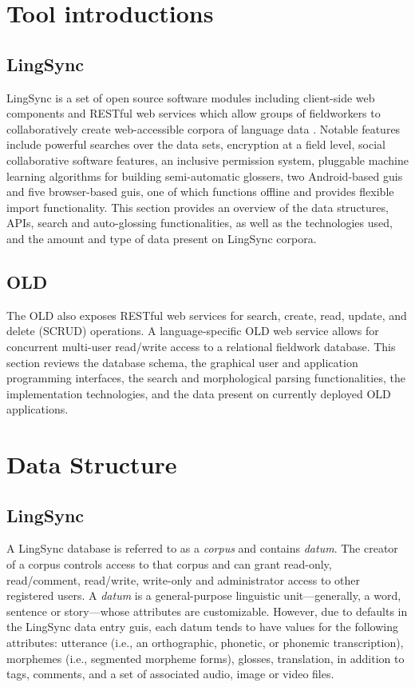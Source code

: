 \documentclass[11pt]{article}
\begin{document}
\section{Tool introductions}


\subsection{LingSync}\label{sec:lingsync}

LingSync is a set of open source software modules including client-side web
components and RESTful web services which allow groups of fieldworkers to
collaboratively create web-accessible corpora of language data
\cite{lingsync:2012}. Notable features include powerful searches over the data
sets, encryption at a field level, social collaborative software features, an
inclusive permission system, pluggable machine learning algorithms for building
semi-automatic glossers, two Android-based \glspl{gui} and five browser-based \glspl{gui},
one of which functions offline and provides flexible import functionality. This
section provides an overview of the data structures, APIs, search and
auto-glossing functionalities, as well as the technologies used, and the amount
and type of data present on LingSync corpora.%



\subsection{OLD}\label{sec:old}

The OLD also exposes RESTful web services for search, create, read, update, and delete
(SCRUD) operations. A language-specific OLD web service allows for concurrent
multi-user read/write access to a relational fieldwork database. This section
 reviews the database schema, the graphical user and
application programming interfaces, the search and morphological parsing
functionalities, the implementation technologies, and the data present on
currently deployed OLD applications.


\section{Data Structure}

\subsection{LingSync}

A LingSync database is referred to as a \emph{corpus} and contains
\textit{datum}. The creator of a corpus controls access to that corpus and can
grant read-only, read/comment, read/write, write-only and administrator access
to other registered users. A \emph{datum} is a general-purpose linguistic
unit---generally, a word, sentence or story---whose attributes are
customizable. However, due to defaults in the LingSync data entry \glspl{gui}, each
datum tends to have values for the following attributes: utterance (i.e., an
orthographic, phonetic, or phonemic transcription), morphemes (i.e., segmented
morpheme forms), glosses, translation, in addition to tags, comments, and a set
of associated audio, image or video files. 
\end{document}

